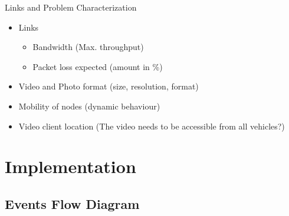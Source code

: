 \documentclass{beamer}
\begin{document}
\begin{frame}{Links and Problem Characterization}
\begin{itemize}
  \item Links
      \begin{itemize}
          \item Bandwidth (Max. throughput)
          \item Packet loss expected (amount in \%)
        \end{itemize}
  \item Video and Photo format (size, resolution, format)
  \item Mobility of nodes (dynamic behaviour) 
  \item Video client location (The video needs to be accessible from all
  vehicles?)
\end{itemize}
\end{frame}


\section{Implementation}

\subsection{Events Flow Diagram}
\end{document}
